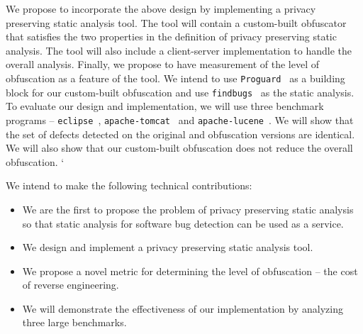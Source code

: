 \documentclass[conference]{IEEEtran}
\begin{document}
We propose to incorporate the above design by implementing a privacy preserving static analysis tool. 
The tool will contain a custom-built obfuscator that satisfies the two properties in the definition 
of privacy preserving static analysis. The tool will also include a client-server implementation to handle 
the overall analysis. Finally, we propose to have measurement of the level of obfuscation as a feature of the tool. 
We intend to use {\tt Proguard}~\cite{proguard} as a building block for our custom-built obfuscation and use 
{\tt findbugs}~\cite{findbugs} as the static analysis. 
To evaluate our design and implementation, we will use three benchmark programs -- {\tt eclipse}~\cite{eclipse}, 
{\tt apache-tomcat}~\cite{tomcat} and {\tt apache-lucene}~\cite{lucene}. We will 
show that the set of defects detected on the original and obfuscation versions are identical. 
We will also show that our custom-built obfuscation does not reduce the overall obfuscation. `

We intend to make the following technical contributions: 

\begin{itemize}
\item We are the first to propose the problem of privacy preserving static analysis so that static analysis for
      software bug detection can be used as a service. 
\item We design and implement a privacy preserving static analysis tool. 
\item We propose a novel metric for determining the level of obfuscation -- the cost of reverse engineering. 
\item We will demonstrate the effectiveness of our implementation by analyzing three large benchmarks. 
\end{itemize}
\end{document}
